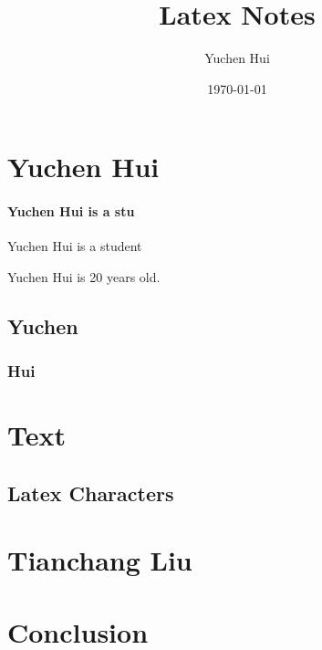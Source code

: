 \documentclass[11pt,oneside,a4paper]{article}
\title{Latex Notes}
\date{\today}
\author{Yuchen Hui}
\begin{document}
\maketitle

\tableofcontents
\section{Yuchen Hui}
      \paragraph{Yuchen Hui is a stu }
      
      Yuchen Hui is a student 

      Yuchen Hui is 20 years old.
      \subsection{Yuchen}
            \subsubsection{Hui}

\section{Text}
      \subsection{Latex Characters}
\section{Tianchang Liu}
\section{Conclusion}

\end{document}
